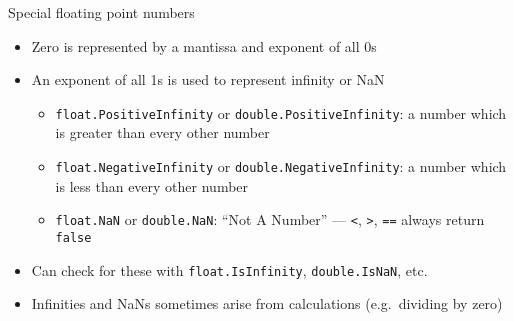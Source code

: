 \begin{frame}[fragile]{Special floating point numbers}
	\begin{itemize}
		\pause\item Zero is represented by a mantissa and exponent of all 0s
		\pause\item An exponent of all 1s is used to represent infinity or NaN
			\begin{itemize}
				\pause\item \lstinline{float.PositiveInfinity} or \lstinline{double.PositiveInfinity}:
					a number which is greater than every other number
				\pause\item \lstinline{float.NegativeInfinity} or \lstinline{double.NegativeInfinity}:
					a number which is less than every other number
				\pause\item \lstinline{float.NaN} or \lstinline{double.NaN}:
					``Not A Number'' --- \lstinline{<}, \lstinline{>}, \lstinline{==}
					always return \lstinline{false}
			\end{itemize}
		\pause\item Can check for these with \lstinline{float.IsInfinity},
			\lstinline{double.IsNaN}, etc.
		\pause\item Infinities and NaNs sometimes arise from calculations (e.g.\ dividing by zero)
	\end{itemize}
\end{frame}

